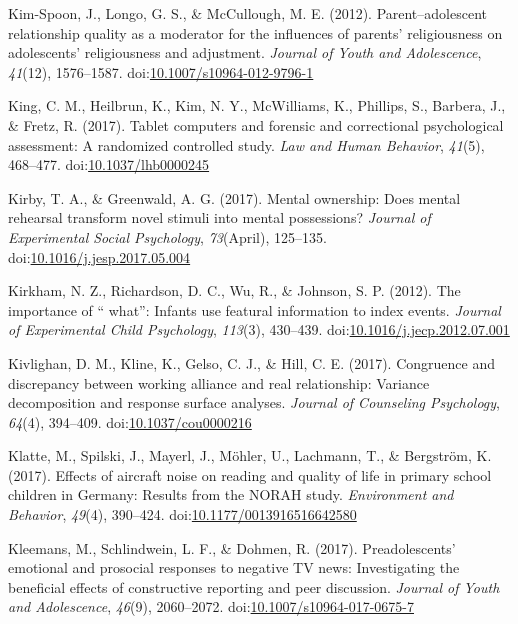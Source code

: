 \documentclass[english,man]{apa6}
\theoremstyle{definition}
\theoremstyle{definition}
\theoremstyle{definition}
\theoremstyle{remark}
\begin{document}
\hypertarget{ref-Kim-Spoon2012}{}
Kim-Spoon, J., Longo, G. S., \& McCullough, M. E. (2012).
Parent--adolescent relationship quality as a moderator for the
influences of parents' religiousness on adolescents' religiousness and
adjustment. \emph{Journal of Youth and Adolescence}, \emph{41}(12),
1576--1587.
doi:\href{https://doi.org/10.1007/s10964-012-9796-1}{10.1007/s10964-012-9796-1}

\hypertarget{ref-King2017a}{}
King, C. M., Heilbrun, K., Kim, N. Y., McWilliams, K., Phillips, S.,
Barbera, J., \& Fretz, R. (2017). Tablet computers and forensic and
correctional psychological assessment: A randomized controlled study.
\emph{Law and Human Behavior}, \emph{41}(5), 468--477.
doi:\href{https://doi.org/10.1037/lhb0000245}{10.1037/lhb0000245}

\hypertarget{ref-Kirby2017}{}
Kirby, T. A., \& Greenwald, A. G. (2017). Mental ownership: Does mental
rehearsal transform novel stimuli into mental possessions? \emph{Journal
of Experimental Social Psychology}, \emph{73}(April), 125--135.
doi:\href{https://doi.org/10.1016/j.jesp.2017.05.004}{10.1016/j.jesp.2017.05.004}

\hypertarget{ref-Kirkham2012}{}
Kirkham, N. Z., Richardson, D. C., Wu, R., \& Johnson, S. P. (2012). The
importance of `` what'': Infants use featural information to index
events. \emph{Journal of Experimental Child Psychology}, \emph{113}(3),
430--439.
doi:\href{https://doi.org/10.1016/j.jecp.2012.07.001}{10.1016/j.jecp.2012.07.001}

\hypertarget{ref-Kivlighan2017}{}
Kivlighan, D. M., Kline, K., Gelso, C. J., \& Hill, C. E. (2017).
Congruence and discrepancy between working alliance and real
relationship: Variance decomposition and response surface analyses.
\emph{Journal of Counseling Psychology}, \emph{64}(4), 394--409.
doi:\href{https://doi.org/10.1037/cou0000216}{10.1037/cou0000216}

\hypertarget{ref-Klatte2017}{}
Klatte, M., Spilski, J., Mayerl, J., Möhler, U., Lachmann, T., \&
Bergström, K. (2017). Effects of aircraft noise on reading and quality
of life in primary school children in Germany: Results from the NORAH
study. \emph{Environment and Behavior}, \emph{49}(4), 390--424.
doi:\href{https://doi.org/10.1177/0013916516642580}{10.1177/0013916516642580}

\hypertarget{ref-Kleemans2017}{}
Kleemans, M., Schlindwein, L. F., \& Dohmen, R. (2017). Preadolescents'
emotional and prosocial responses to negative TV news: Investigating the
beneficial effects of constructive reporting and peer discussion.
\emph{Journal of Youth and Adolescence}, \emph{46}(9), 2060--2072.
doi:\href{https://doi.org/10.1007/s10964-017-0675-7}{10.1007/s10964-017-0675-7}
\end{document}
